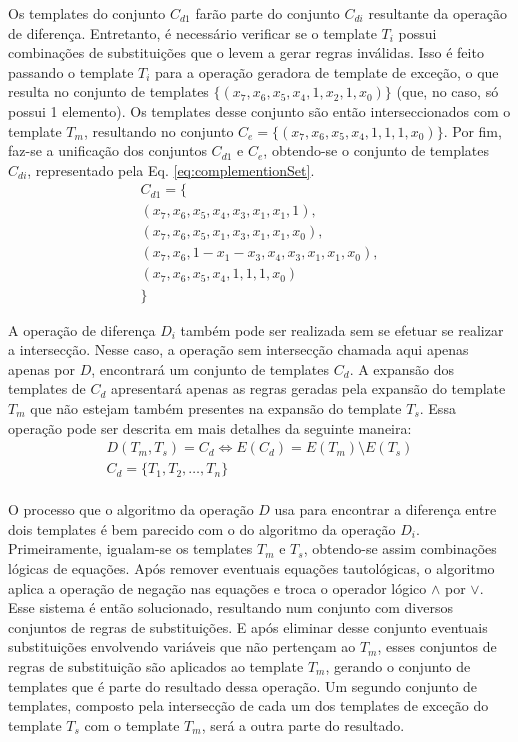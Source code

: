 Os templates do conjunto $C_{d1}$ farão parte do conjunto $C_{di}$ resultante da operação de diferença. Entretanto, é necessário verificar se o template $T_i$ possui combinações de substituições que o levem a gerar regras inválidas. Isso é feito passando o template $T_i$ para a operação geradora de template de exceção, o que resulta no conjunto de templates $\{(x_7, x_6, x_5, x_4, 1, x_2, 1, x_0)\}$ (que, no caso, só possui 1 elemento). Os templates desse conjunto são então interseccionados com o template $T_m$, resultando no conjunto $C_e = \{(x_7, x_6, x_5, x_4, 1, 1, 1, x_0)\}$. Por fim, faz-se a unificação dos conjuntos $C_{d1}$ e $C_e$, obtendo-se o conjunto de templates $C_{di}$, representado pela Eq. \ref{eq:complementionSet}.
\begin{equation}
\begin{split}
C_{d1} = \{\\(x_7, x_6, x_5, x_4, x_3, x_1, x_1, 1), \\(x_7, x_6, x_5, x_1, x_3, x_1, x_1, x_0), \\(x_7, x_6, 1 - x_1 - x_3, x_4, x_3, x_1, x_1, x_0), \\(x_7, x_6, x_5, x_4, 1, 1, 1, x_0)\\\}
\label{eq:complementionSet}
\end{split}
\end{equation}

A operação de diferença $D_i$ também pode ser realizada sem se efetuar se realizar a intersecção. Nesse caso, a operação sem intersecção chamada aqui apenas apenas por $D$, encontrará um conjunto de templates $C_d$. A expansão dos templates de $C_{d}$ apresentará apenas as regras geradas pela expansão do template $T_m$ que não estejam também presentes na expansão do template $T_s$. Essa operação pode ser descrita em mais detalhes da seguinte maneira:
\begin{equation}
\begin{split}
D(T_m,T_s)= C_d \Leftrightarrow E(C_d) = E(T_m) \setminus E(T_s) \\
C_d = \{T_1,T_2,\dots, T_n\}\\
\end{split}
\end{equation}

O processo que o algoritmo da operação $D$ usa para encontrar a diferença entre dois templates é bem parecido com o do algoritmo da operação $D_{i}$. Primeiramente, igualam-se os templates $T_m$ e $T_s$, obtendo-se assim combinações lógicas de equações. Após remover eventuais equações tautológicas, o algoritmo aplica a operação de negação nas equações e troca o operador lógico $\wedge$ por $\vee$. Esse sistema é então solucionado, resultando num conjunto com diversos conjuntos de regras de substituições. E após eliminar desse conjunto eventuais substituições envolvendo variáveis que não pertençam ao $T_m$, esses conjuntos de regras de substituição são aplicados ao template $T_m$, gerando o conjunto de templates que é parte do resultado dessa operação. Um segundo conjunto de templates, composto pela intersecção de cada um dos templates de exceção do template $T_s$ com o template $T_m$, será a outra parte do resultado.


